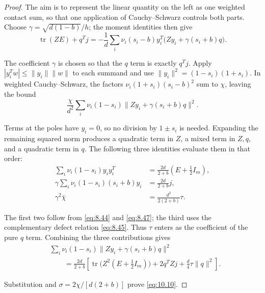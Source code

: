 \begin{proof}
The aim is to represent the linear quantity on the left as one
weighted contact sum, so that one application of Cauchy--Schwarz controls both
parts. Choose $\gamma=\sqrt{d(1-b)}/h$; the moment identities then give
\begin{equation}\label{eq:10.11}
\operatorname{tr}(ZE)+q^Tj
=-\frac1d\sum_i\nu_i(s_i-b)y_i^T\bigl(Zy_i+\gamma(s_i+b)q\bigr).
\end{equation}

The coefficient $\gamma$ is chosen so that the $q$ term is exactly $q^Tj$.
Apply $|y_i^Tw|\le\|y_i\|\|w\|$ to each summand and use
$\|y_i\|^2=(1-s_i)(1+s_i)$. In weighted Cauchy--Schwarz, the factors
$\nu_i(1+s_i)(s_i-b)^2$ sum to $\chi$, leaving the bound
\begin{equation}\label{eq:10.12}
\frac{\chi}{d^2}\sum_i\nu_i(1-s_i)
\|Zy_i+\gamma(s_i+b)q\|^2.
\end{equation}

Terms at the poles have $y_i=0$, so no division by $1\pm s_i$ is needed.
Expanding the remaining squared norm produces a quadratic term in $Z$, a
mixed term in $Z,q$, and a quadratic term in $q$. The following three identities
evaluate them in that order:
\begin{equation}\label{eq:10.13}
\begin{aligned}
\sum_i\nu_i(1-s_i)y_iy_i^T&=\frac{2d}{2+b}(E+\tfrac12I_m),\\
\gamma\sum_i\nu_i(1-s_i)(s_i+b)y_i&=\frac{2d}{2+b}j,\\
\gamma^2\bar\chi&=\frac{d^2}{2(2+b)}\tau.
\end{aligned}
\end{equation}

The first two follow from \eqref{eq:8.44} and \eqref{eq:8.47}; the third uses the complementary
defect relation \eqref{eq:8.45}. Thus $\tau$ enters as the coefficient of the pure
$q$ term. Combining the three contributions gives
\begin{equation}\label{eq:10.14}
\begin{aligned}
&\sum_i\nu_i(1-s_i)\|Zy_i+\gamma(s_i+b)q\|^2\\
&\qquad=\frac{2d}{2+b}\left[
\operatorname{tr}\bigl(Z^2(E+\tfrac12I_m)\bigr)
+2q^TZj+\frac d4\tau\|q\|^2\right].
\end{aligned}
\end{equation}

Substitution and $\sigma=2\chi/[d(2+b)]$ prove \eqref{eq:10.10}. 
\end{proof}

